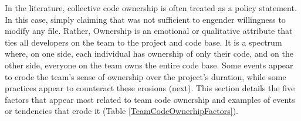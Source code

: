 In the literature, collective code ownership is often treated as a policy statement. In this case, simply claiming that  was not sufficient to engender willingness to modify any file. Rather, Ownership is an emotional or qualitative attribute that ties all developers on the team to the project and code base. It is a spectrum where, on one side, each individual has ownership of only their code, and on the other side, everyone on the team owns the entire code base. Some events appear to erode the team's sense of ownership over the project's duration, while some practices appear to counteract these erosions (next). This section details the five factors that appear most related to team code ownership and examples of events or tendencies that erode it (Table \ref{TeamCodeOwnerhipFactors}). 


